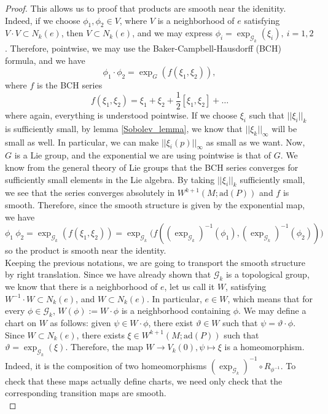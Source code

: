\begin{proof}
    This allows us to proof that products are smooth near the idenitity. Indeed, if we choose \(\phi_1, \phi_2 \in V \), where \(V\) is a neighborhood of \(e\) satisfying \(V\cdot V \subset N_k(e)\), then \(V \subset N_k(e)\), and we may express \(\phi_i=\exp_{\mathscr{G}_k}(\xi_i), \ i=1,2\). Therefore, pointwise, we may use the Baker-Campbell-Hausdorff (BCH) formula, and we have
    \[
    \phi_1 \cdot \phi_2 = \exp_G (f(\xi_1, \xi_2)),
    \]
    where \(f\) is the BCH series
    \[
    f(\xi_1, \xi_2)=\xi_1+\xi_2+\frac{1}{2}[\xi_1, \xi_2] +\ldots
    \]
    where again, everything is understood pointwise. If we choose \(\xi_i\) such that \(||\xi_i||_k\) is sufficiently small, by lemma \ref{Sobolev_lemma}, we know that \(||\xi_k||_\infty\) will be small as well. In particular, we can make \(||\xi_i(p)||_\infty\) as small as we want. Now, \(G\) is a Lie group, and the exponential we are using pointwise is that of \(G\). We know from the general theory of Lie groups that the BCH series converges for sufficiently small elements in the Lie algebra. By taking \(||\xi_i||_k\) sufficiently small, we see that the series converges absolutely in \(W^{k+1}(M; \mathrm{ad}(P))\) and \(f\) is smooth. Therefore, since the smooth structure is given by the exponential map, we have
    \[
    \phi_1 \ \phi_2 =\exp_{\mathscr{G}_k}(f(\xi_1, \xi_2))=\exp_{\mathscr{G}_k}\big(f((\exp_{\mathscr{G}_k})^{-1}(\phi_1), (\exp_{\mathscr{G}_k})^{-1}(\phi_2))\big)
    \]
     so the product is smooth near the identity.  \\

    Keeping the previous notations, we are going to transport the smooth structure by right translation. Since we have already shown that \(\mathscr{G}_k\) is a topological group, we know that there is a neighborhood of \(e\), let us call it \(W\), satisfying \(W^{-1}\cdot W \subset N_k(e)\), and \(W \subset N_k(e)\). In particular, \(e \in W\), which means that for every \(\phi \in \mathscr{G}_k\), \(W(\phi):=W \cdot \phi\) is a neighborhood containing \(\phi\). We may define a chart on \(W\) as follows: given \(\psi\in W\cdot \phi\), there exist \(\vartheta \in W\) such that \(\psi=\vartheta \cdot \phi\). Since \(W \subset N_k(e)\), there exists \(\xi \in W^{k+1}(M;\mathrm{ad}(P))\) such that \(\vartheta = \exp_{\mathscr{G}_k}(\xi)\). Therefore, the map \(W \to V_k(0), \psi \mapsto \xi\) is a homeomorphism. Indeed, it is the composition of two homeomorphisms \((\exp_{\mathscr{G}_k})^{-1}\circ R_{\phi^{-1}}\). To check that these maps actually define charts, we need only check that the corresponding transition maps are smooth. \\


\end{proof}
